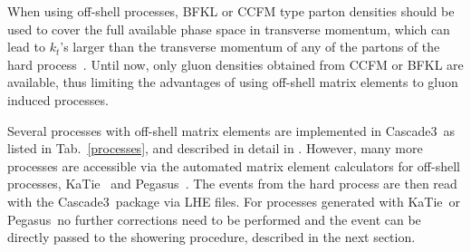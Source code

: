 \documentclass[11pt]{article} \usepackage{mystyle-new}
\def\prp{t}
\def\kt{\ensuremath{k_{\prp}}}
\def\cascade{{\sc Cascade3}}
\def\katie{{\sc KaTie}}
\def\pegasus{{\sc Pegasus}}
\newcommand{\ccfm}{Ciafaloni:1987ur,Catani:1989yc,Catani:1989sg,Marchesini:1994wr}
\newcommand{\bfkl}{Kuraev:1976ge,Kuraev:1977fs,Balitsky:1978ic}
\begin{document}
When using off-shell processes, BFKL or CCFM type parton densities should be used  
to cover the full available phase space in transverse momentum, which can lead to \kt 's 
 larger than the transverse momentum of any of the partons of the hard process~\cite{Hautmann:2014uua}. 
Until now, only gluon densities obtained from CCFM\cite{\ccfm} or BFKL\cite{\bfkl} are available, thus limiting the advantages of using off-shell matrix elements to gluon induced processes.

Several processes with off-shell matrix elements are implemented in \cascade\, as listed in Tab.~\ref{processes}, and described in detail in \cite{Jung:2010si}. However, many more processes are accessible via the automated matrix element calculators for off-shell processes, \katie ~\cite{vanHameren:2016kkz} and  \pegasus~\cite{Lipatov:2019oxs}. The events from the hard process are then read with the \cascade\ package via LHE files.
For processes generated with \katie\ or \pegasus\ no further corrections need to be performed and the event can be directly passed to the showering procedure, described in the next section.
\end{document}
